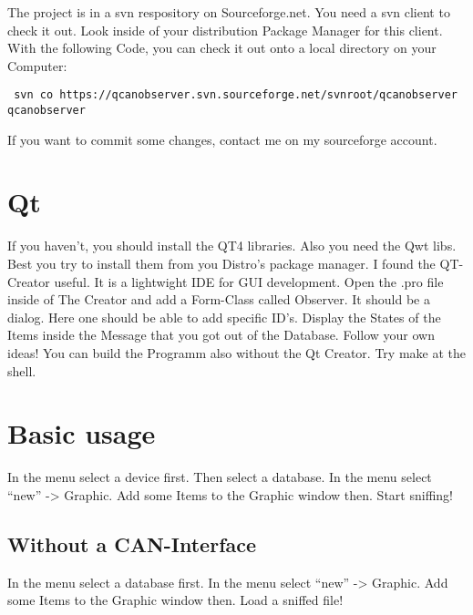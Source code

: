 \documentclass[a4paper,10pt]{article}
\begin{document}
The project is in a svn respository on Sourceforge.net.
You need a svn client to check it out. Look inside of your distribution Package Manager for this client.
With the following Code, you can check it out onto a local directory on your Computer:
\begin{verbatim}
 svn co https://qcanobserver.svn.sourceforge.net/svnroot/qcanobserver qcanobserver 
\end{verbatim} 

If you want to commit some changes, contact me on my sourceforge account. 

\section{Qt}
If you haven't, you should install the QT4 libraries. Also you need the Qwt libs. Best you try to install them from you Distro's package manager.
I found the QT-Creator useful. It is a lightwight IDE for GUI development.
Open the .pro file inside of The Creator and add a Form-Class called Observer. It should be a dialog. 
Here one should be able to add specific ID's. Display the States of the Items inside the Message that you got out of the Database.
Follow your own ideas!
You can build the Programm also without the Qt Creator. Try make at the shell.

\section{Basic usage}
In the menu select a device first. Then select a database. In the menu select ``new'' -> Graphic. Add some Items to the Graphic window then. Start sniffing!

\subsection{Without a CAN-Interface}
In the menu select a database first. In the menu select ``new'' -> Graphic. Add some Items to the Graphic window then. Load a sniffed file!
\end{document}
